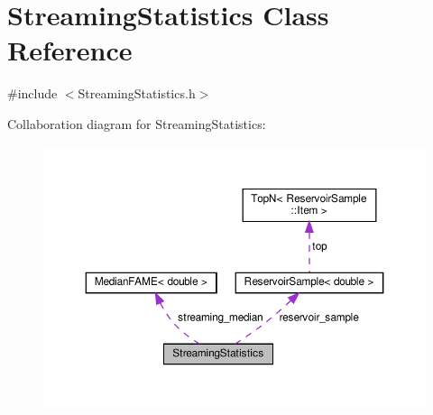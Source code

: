 \hypertarget{class_streaming_statistics}{}\section{Streaming\+Statistics Class Reference}
\label{class_streaming_statistics}


{\ttfamily \#include $<$Streaming\+Statistics.\+h$>$}



Collaboration diagram for Streaming\+Statistics\+:
\nopagebreak
\begin{figure}[H]
\begin{center}
\leavevmode
\includegraphics[width=350pt]{class_streaming_statistics__coll__graph}
\end{center}
\end{figure}
